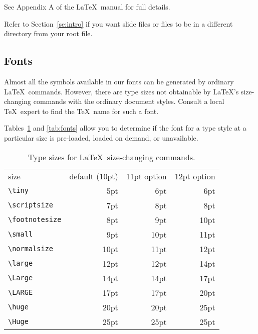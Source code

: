 See Appendix A of the \LaTeX\ manual for full details.

Refer to Section~\ref{se:intro} if you want slide
files or \hbox{\verb||} files to be in a different directory from
your root file.

\subsection{Fonts}
\label{se:fonts}
Almost all the symbols available in our fonts can be generated by
ordinary \LaTeX\ commands.  However, there are type sizes not
obtainable by \LaTeX's size-changing commands with the ordinary
document styles.  Consult a local \TeX\ expert to find the
\TeX\ name for such a font.

Tables~\ref{tab:styles} and \ref{tab:fonts} allow you
to determine if the font for a type style at a particular
size is pre-loaded, loaded on demand, or unavailable.
\begin{table}[htb]
\centering
\begin{tabular}{l|r|r|r|}
\multicolumn{1}{l}{size} & 
\multicolumn{1}{c}{default (10pt)} &
        \multicolumn{1}{c}{11pt option}  &
        \multicolumn{1}{c}{12pt option}\\
\cline{2-4}
\verb|\tiny|       & 5pt  & 6pt & 6pt\\
\cline{2-4}
\verb|\scriptsize| & 7pt  & 8pt & 8pt\\
\cline{2-4}
\verb|\footnotesize| & 8pt & 9pt & 10pt\\
\cline{2-4}
\verb|\small|      & 9pt  & 10pt & 11pt\\
\cline{2-4}
\verb|\normalsize| & 10pt & 11pt & 12pt \\
\cline{2-4}
\verb|\large|      & 12pt & 12pt & 14pt \\
\cline{2-4}
\verb|\Large|      & 14pt & 14pt & 17pt \\
\cline{2-4}
\verb|\LARGE|      & 17pt & 17pt & 20pt\\
\cline{2-4}
\verb|\huge|       & 20pt & 20pt & 25pt\\
\cline{2-4}
\verb|\Huge|       & 25pt & 25pt & 25pt\\
\cline{2-4}
\end{tabular}
\caption{Type sizes for \LaTeX\ size-changing commands.}\label{tab:styles}
\end{table}

